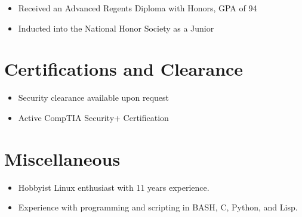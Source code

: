 \documentclass[11pt]{resume}
\begin{document}

\begin{itemize}
\item Received an Advanced Regents Diploma with Honors, GPA of 94
\item Inducted into the National Honor Society as a Junior
\end{itemize}

\section{Certifications and Clearance}
\begin{itemize}
\item Security clearance available upon request
\item Active CompTIA Security+ Certification
\end{itemize}

\section{Miscellaneous}
\begin{itemize}
\item Hobbyist Linux enthusiast with 11 years experience.
\item Experience with programming and scripting in BASH, C, Python, and Lisp.
\end{itemize}
\end{document}
